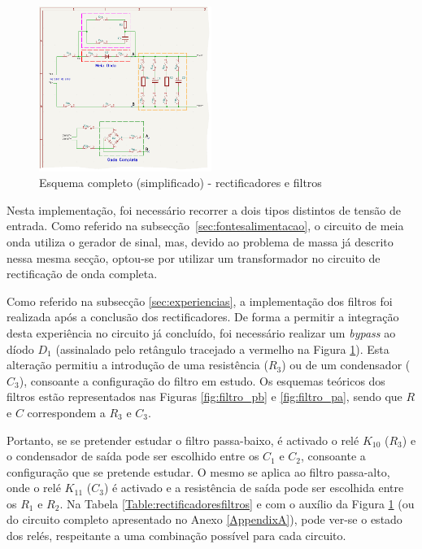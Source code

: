 \begin{figure}[hbtp]
	\centering
	\includegraphics[width=0.5\textwidth]{figures/rec_fil_FULL.png}
	\caption{Esquema completo (simplificado) - rectificadores e filtros}
	\label{fig:rectificacao_filtragem_full}
\end{figure}

Nesta implementação, foi necessário recorrer a dois tipos distintos de tensão de entrada. Como referido na subsecção~\ref{sec:fontesalimentacao}, o circuito de meia onda utiliza o gerador de sinal, mas, devido ao problema de massa já descrito nessa mesma secção, optou-se por utilizar um transformador no circuito de rectificação de onda completa.

Como referido na subsecção \ref{sec:experiencias}, a implementação dos filtros foi realizada após a conclusão dos rectificadores. De forma a permitir a integração desta experiência no circuito já concluído, foi necessário realizar um \textit{bypass} ao díodo $D_{1}$ (assinalado pelo retângulo tracejado a vermelho na Figura \ref{fig:rectificacao_filtragem_full}). Esta alteração permitiu a introdução de uma resistência ($R_{3}$) ou de um condensador ($C_{3}$), consoante a configuração do filtro em estudo. Os esquemas teóricos dos filtros estão representados nas Figuras \ref{fig:filtro_pb} e \ref{fig:filtro_pa}, sendo que $R$ e $C$  correspondem a $R_{3}$ e $C_{3}$. 

Portanto, se se pretender estudar o filtro passa-baixo, é activado o relé $K_{10}$ ($R_{3}$) e o condensador de saída pode ser escolhido entre os $C_{1}$ e $C_{2}$, consoante a configuração que se pretende estudar. O mesmo se aplica ao filtro passa-alto, onde o relé $K_{11}$ ($C_{3}$) é activado e a resistência de saída pode ser escolhida entre os $R_{1}$ e $R_{2}$. Na Tabela \ref{Table:rectificadoresfiltros} e com o auxílio da Figura \ref{fig:rectificacao_filtragem_full} (ou do circuito completo apresentado no Anexo \ref{AppendixA}), pode ver-se o estado dos relés, respeitante a uma combinação possível para cada circuito. 

